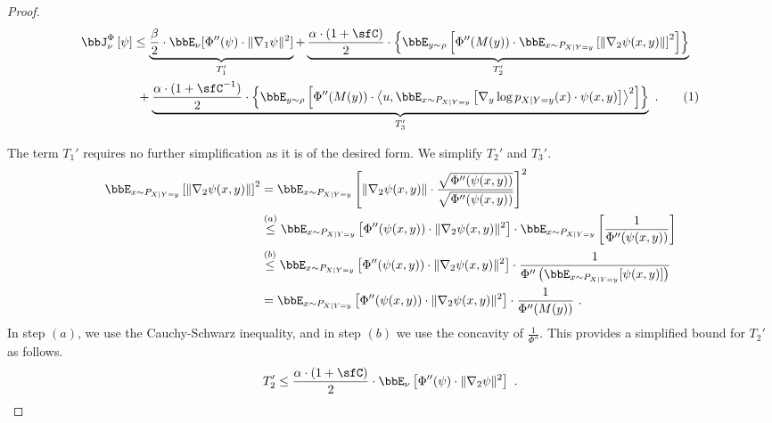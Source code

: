 \documentclass[11pt]{article}
\newcommand{\numberthis}{\addtocounter{equation}{1}\tag{\theequation}}
\newcommand{\Phient}[3]{
    \ensuremath{\if$#3$\bbJ_{#1}^{#2}\else\bbJ_{#1}^{#2}\left[#3\right]\fi}}
\begin{document}
\begin{proof}
\begin{align*}
\Phient{\nu}{\Phi}{\psi} &\leq \underbrace{\frac{\beta}{2} \cdot \bbE_{\nu}[\Phi''(\psi) \cdot \|\nabla_{1}\psi\|^{2}]}_{T_{1}'} + \underbrace{\frac{\alpha \cdot (1 + \sfC)}{2} \cdot \left\{\bbE_{y \sim \rho}\left[\Phi''(M(y)) \cdot \bbE_{x \sim P_{X | Y = y}}\left[\|\nabla_{2}\psi(x, y)\|\right]^{2}\right]\right\}}_{T_{2}'} \\
&~ + \underbrace{\frac{\alpha \cdot (1 + \sfC^{-1})}{2} \cdot \left\{\bbE_{y \sim \rho}\left[\Phi''(M(y)) \cdot \left\langle u, \bbE_{x \sim P_{X | Y = y}}\left[\nabla_{y}\log p_{X | Y = y}(x) \cdot \psi(x, y) \right]\right\rangle^{2}\right]\right\}}_{T_{3}'}~.\numberthis\label{eq:prelim-T1-T2-sum-bound-joint}
\end{align*}

The term \(T_{1}'\) requires no further simplification as it is of the desired form.
We simplify \(T_{2}'\) and \(T_{3}'\).
\begin{align*}
    \bbE_{x \sim P_{X | Y = y}}\left[\|\nabla_{2}\psi(x, y)\|\right]^{2} &= \bbE_{x \sim P_{X | Y = y}}\left[\|\nabla_{2}\psi(x, y)\| \cdot \frac{\sqrt{\Phi''(\psi(x, y))}}{\sqrt{\Phi''(\psi(x, y))}}\right]^{2} \\
    &\overset{(a)}\leq \bbE_{x \sim P_{X | Y = y}}\left[\Phi''(\psi(x, y)) \cdot \|\nabla_{2}\psi(x, y)\|^{2}\right] \cdot \bbE_{x \sim P_{X | Y = y}}\left[\frac{1}{\Phi''(\psi(x, y))}\right] \\
    &\overset{(b)}\leq \bbE_{x \sim P_{X | Y = y}}\left[\Phi''(\psi(x, y)) \cdot \|\nabla_{2}\psi(x, y)\|^{2}\right] \cdot \frac{1}{\Phi''\left(\bbE_{x \sim P_{X | Y = y}}[\psi(x, y)]\right)}~\\
    &= \bbE_{x \sim P_{X | Y = y}}\left[\Phi''(\psi(x, y)) \cdot \|\nabla_{2}\psi(x, y)\|^{2}\right] \cdot \frac{1}{\Phi''(M(y))}~.
\end{align*}
In step \((a)\), we use the Cauchy-Schwarz inequality, and in step \((b)\) we use the concavity of \(\frac{1}{\Phi''}\).
This provides a simplified bound for \(T_{2}'\) as follows.
\begin{equation}
\label{eq:T2dash-bound}
    T_{2}' \leq \frac{\alpha \cdot (1 + \sfC)}{2} \cdot \bbE_{\nu}\left[\Phi''(\psi) \cdot \|\nabla_{2}\psi\|^{2}\right]~.
\end{equation}


\end{proof}
\end{document}
